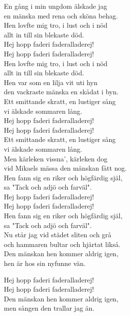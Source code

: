 \documentclass[a6paper, 10pt, twoside]{article}
\begin{document}
\begin{center}
\end{center}
\begin{lyrics}
En gång i min ungdom älskade jag\\
en mänska med rena och sköna behag.\\
Hen lovfte mig tro, i lust och i nöd\\
allt in till sin blekaste död.
\vspace{5pt}\\
Hej hopp faderi faderalladerej!\\
Hej hopp faderi faderalladerej!\\
Hen lovfte mig tro, i lust och i nöd\\
allt in till sin blekaste död.
\vspace{5pt}\\
Hen var som en lilja vit uti hyn\\
den vackraste mänska en skådat i byn.\\
Ett smittande skratt, en lustiger sång\\
vi älskade sommaren lång.
\vspace{5pt}\\
Hej hopp faderi faderalladerej!\\
Hej hopp faderi faderalladerej!\\
Ett smittande skratt, en lustiger sång\\
vi älskade sommaren lång.
\vspace{5pt}\\
Men kärleken vissna', kärleken dog\\
vid Mikaels mässa den mänskan fått nog.\\
Hen fann sig en riker och högfärdig själ,\\
sa "Tack och adjö och farväl".
\vspace{5pt}\\
Hej hopp faderi faderalladerej!\\
Hej hopp faderi faderalladerej!\\
Hen fann sig en riker och högfärdig själ,\\
sa "Tack och adjö och farväl".
\vspace{5pt}\\
Nu står jag vid städet sliten och grå\\
och hammaren bultar och hjärtat likså.\\
Den mänskan hen kommer aldrig igen,\\
hen är hos sin nyfunne vän.

\newpage
\noindent
Hej hopp faderi faderalladerej!\\
Hej hopp faderi faderalladerej!\\
Den mänskan hen kommer aldrig igen,\\
men sången den trallar jag än. 
\end{lyrics}
\end{document}
